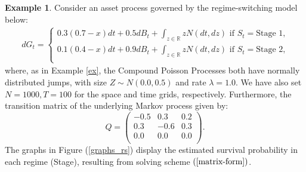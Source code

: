 \documentclass[11pt,reqno]{article}
\theoremstyle{definition}
\newtheorem{example}[theorem]{Example}
\begin{document}
\begin{example}\label{ex_rs}
Consider an asset process governed by the regime-switching model below: 
 \begin{eqnarray} 
 	dG_t =  
 	\begin{cases} 
 		  0.3(0.7 -x)dt +0.5dB_t + \int_{z\in \mathbb{R}} z N(dt,dz) \text{ if $S_t=$Stage 1,}   \\
 		  0.1(0.4 -x)dt +0.9dB_t + \int_{z\in \mathbb{R}} z N(dt,dz) \text{ if $S_t=$Stage 2,} \\
 	\end{cases}
 \end{eqnarray}
 	where, as in Example \ref{ex}, the Compound Poisson Processes both have normally distributed jumps, with size $Z \sim N(0.0,0.5)$ and rate $\lambda = 1.0$. We have also set $N=1000, T= 100$ for the space and time grids, respectively. Furthermore, the transition matrix of the underlying Markov process given by:
$$Q=\left(  \begin{array}{ccc}
	-0.5 & 0.3  & 0.2 \\
	0.3  & -0.6 & 0.3  \\
	0.0 & 0.0 &  0.0 \\
\end{array}
\right).$$
The graphs in Figure (\ref{graphs_rs}) display the estimated survival probability in each regime (Stage), resulting from solving scheme $(\ref{matrix-form})$. 


\end{example}
\end{document}
